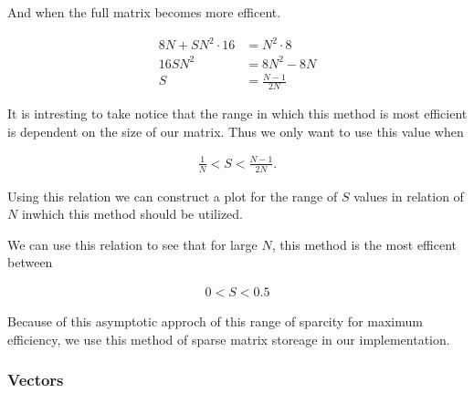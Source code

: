 \documentclass[../fem.tex]{subfiles}
\begin{document}
And when the full matrix becomes more efficent.

\begin{align*}
  8N+SN^2\cdot16&=N^2\cdot8\\
  16SN^2&=8N^2-8N\\
  S&=\frac{N-1}{2N}
\end{align*}

It is intresting to take notice that the range in which this method is most
efficient is dependent on the size of our matrix. Thus we only want to use this
value when

\begin{align*}
  \frac{1}{N}<S<\frac{N-1}{2N}.
\end{align*}

Using this relation we can construct a plot for the range of $S$ values in
relation of $N$ inwhich this method should be utilized.


We can use this relation to see that for large $N$, this method is the most
efficent between

\begin{align*}
   0 < S < 0.5
\end{align*}

Because of this asymptotic approch of this range of sparcity for maximum
efficiency, we use this method of sparse matrix storeage in our implementation.

\begin{Figure}
  \begin{center}
  \end{center}
  \label{fig:mat_CRS}
\end{Figure}

\subsubsection{Vectors}%
\label{ssub:vectors}
\end{document}
